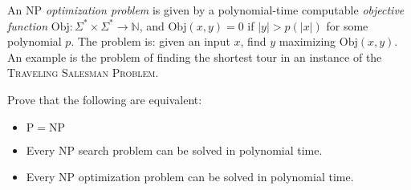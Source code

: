 \documentclass[12pt]{article}
\newcommand{\Obj}{\mathrm{Obj}}
\newcommand{\NP}{\mathrm{NP}}
\newcommand{\PTIME}{\mathrm{P}}
\newcommand{\textprob}[1]{\textsc{#1}}
\begin{document}
An {\em $\NP$ optimization problem} is given by a polynomial-time computable {\em objective function} $\Obj : \Sigma^*\times \Sigma^*\rightarrow \mathbb{N}$, and $\Obj(x,y)=0$ if $|y|>p(|x|)$ for some polynomial $p$.  The problem is: given an input $x$, find $y$ maximizing $\Obj(x,y)$.  An example is the problem of finding the shortest tour in an instance of the \textprob{Traveling Salesman Problem}.

Prove that the following are equivalent:
\begin{itemize}
\item $\PTIME=\NP$
\item Every $\NP$ search problem can be solved in polynomial time.
\item Every $\NP$ optimization problem can be solved in polynomial
time.
\end{itemize}
\end{document}
